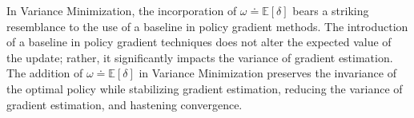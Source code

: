 In Variance Minimization, 
the incorporation of $\omega \doteq \mathbb{E}[\delta]$ 
bears a striking resemblance to the use of a baseline 
in policy gradient methods. The introduction of a baseline 
in policy gradient techniques does not alter 
the expected value of the update; 
rather, it significantly impacts the variance of gradient estimation. 
The addition of $\omega \doteq \mathbb{E}[\delta]$ in Variance Minimization 
 preserves the invariance of the optimal 
policy while stabilizing gradient estimation, 
reducing the variance of gradient estimation, 
and hastening convergence.